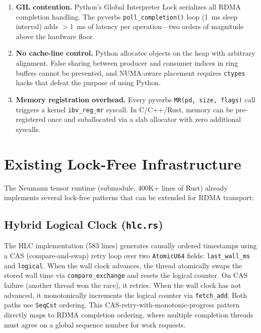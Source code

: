 \documentclass[11pt,letterpaper]{article}
\begin{document}
\begin{enumerate}
    \item \textbf{GIL contention.} Python's Global Interpreter Lock serializes all RDMA completion handling. The pyverbs \texttt{poll\_completion()} loop (1~ms sleep interval) adds $>$1~ms of latency per operation---two orders of magnitude above the hardware floor.

    \item \textbf{No cache-line control.} Python allocates objects on the heap with arbitrary alignment. False sharing between producer and consumer indices in ring buffers cannot be prevented, and NUMA-aware placement requires \texttt{ctypes} hacks that defeat the purpose of using Python.

    \item \textbf{Memory registration overhead.} Every pyverbs \texttt{MR(pd, size, flags)} call triggers a kernel \texttt{ibv\_reg\_mr} syscall. In C/C++/Rust, memory can be pre-registered once and suballocated via a slab allocator with zero additional syscalls.
\end{enumerate}

\section{Existing Lock-Free Infrastructure}

The Neumann tensor runtime (submodule, 400K+ lines of Rust) already implements several lock-free patterns that can be extended for RDMA transport:

\subsection{Hybrid Logical Clock (\texttt{hlc.rs})}

The HLC implementation (583 lines) generates causally ordered timestamps using a CAS (compare-and-swap) retry loop over two \texttt{AtomicU64} fields: \texttt{last\_wall\_ms} and \texttt{logical}. When the wall clock advances, the thread atomically swaps the stored wall time via \texttt{compare\_exchange} and resets the logical counter. On CAS failure (another thread won the race), it retries. When the wall clock has not advanced, it monotonically increments the logical counter via \texttt{fetch\_add}. Both paths use \texttt{SeqCst} ordering. This CAS-retry-with-monotonic-progress pattern directly maps to RDMA completion ordering, where multiple completion threads must agree on a global sequence number for work requests.
\end{document}
